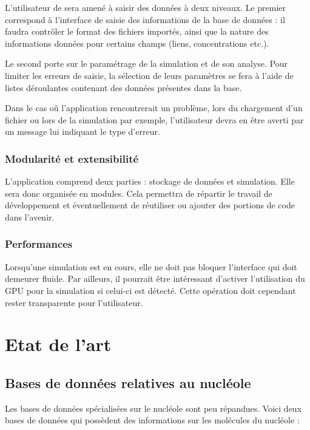 L'utilisateur de \NQ sera amené à saisir des données à deux
niveaux.  Le premier correspond à l'interface de saisie des
informations de la base de données : il faudra contrôler le format
des fichiers importés, ainsi que la nature des informations données
pour certains champs (liens, concentrations etc.).

Le second porte sur le paramétrage de la simulation et de son analyse.
Pour limiter les erreurs de saisie, la sélection de leurs paramètres
se fera à l'aide de listes déroulantes contenant des données présentes
dans la base.

Dans le cas oû l'application rencontrerait un problème, lors du
chargement d'un fichier ou lors de la simulation par exemple,
l'utilisateur devra en être averti par un message lui indiquant le
type d'erreur.

\subsubsection{Modularité et extensibilité}

L'application comprend deux parties : stockage de données et
simulation. Elle sera donc organisée en modules. Cela permettra de
répartir le travail de développement et éventuellement de réutiliser
ou ajouter des portions de code dans l'avenir.

\subsubsection{Performances}

Lorsqu'une simulation est en cours, elle ne doit pas bloquer
l'interface qui doit demeurer fluide. Par ailleurs, il pourrait être
intéressant d'activer l'utilisation du GPU pour la simulation si
celui-ci est détecté. Cette opération doit cependant rester
transparente pour l'utilisateur.

\section{Etat de l'art}

\subsection{Bases de données relatives au nucléole}

Les bases de données spécialisées sur le nucléole sont peu
répandues. Voici deux bases de données qui possèdent des informations sur
les molécules du nucléole :

